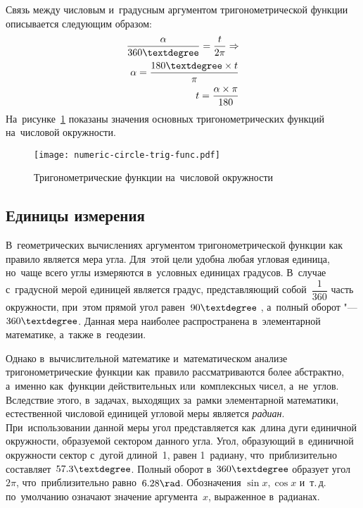 \documentclass[]{scrartcl}
\begin{document}
%
Связь между числовым и~градусным аргументом тригонометрической функции описывается следующим образом:
\begin{equation}\label{eq:numeric-and-angle-argument-link}
	\begin{aligned}
	\frac{\alpha}{360 \textdegree} = \frac{t}{2 \pi} \Rightarrow\\
	\alpha = \frac{180 \textdegree \times t}{\pi}\\
	t = \frac{\alpha \times \pi}{180}
	\end{aligned}
\end{equation}
На~рисунке~\ref{fig:numeric-circle-trig-func} показаны значения основных тригонометрических функций на~числовой окружности.
%
\begin{figure}[ht]
	\centering %
	\texttt{[image: numeric-circle-trig-func.pdf]}
	\caption{Тригонометрические функции на~числовой окружности}\label{fig:numeric-circle-trig-func}
\end{figure}
%
\subsection{Единицы измерения}
В~геометрических вычислениях аргументом тригонометрической функции как правило является мера угла. Для~этой цели удобна любая угловая единица, но~чаще всего углы измеряются в~условных единицах градусов. В~случае с~градусной мерой единицей является градус, представляющий собой~${\textstyle \dfrac{1}{360}}$ часть окружности, при~этом прямой угол равен~${\textstyle 90 \textdegree}$ , а~полный оборот "--- ${\textstyle 360 \textdegree}$. Данная мера наиболее распространена в~элементарной математике, а~также в~геодезии. 

Однако в~вычислительной математике и~математическом анализе тригонометрические функции как~правило рассматриваются более абстрактно, а~именно как~функции действительных или~комплексных чисел, а~не~углов. Вследствие этого, в~задачах, выходящих за~рамки элементарной математики, естественной числовой единицей угловой меры является \emph{радиан}. При~использовании данной меры угол представляется как~длина дуги единичной окружности, образуемой сектором данного угла. Угол, образующий в~единичной окружности сектор с~дугой длиной~1, равен 1~радиану, что~приблизительно составляет~${\textstyle 57.3 \textdegree}$. Полный оборот в~${\textstyle 360 \textdegree}$ образует угол~${\textstyle 2 \pi}$, что~приблизительно равно~${\textstyle 6.28 \rad}$. Обозначения ${\textstyle \sin x, \cos x}$ и~т.\,д. по~умолчанию означают значение аргумента~${\textstyle x}$, выраженное в~радианах.
\end{document}
